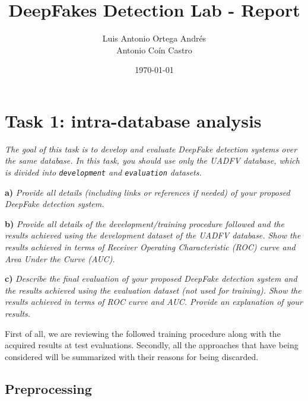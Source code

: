 \documentclass[11pt]{article}
\author{Luis Antonio Ortega Andrés\\Antonio Coín Castro}
\date{\today}
\title{DeepFakes Detection Lab - Report}
\begin{document}
\maketitle

\section*{Task 1: intra-database analysis}

\textit{The goal of this task is to develop and evaluate DeepFake detection systems over the same database. In this task, you should use only the UADFV database, which is divided into \texttt{development} and \texttt{evaluation} datasets.}

\textbf{a)} \textit{Provide all details (including links or references if needed) of your proposed DeepFake detection system.}

\textbf{b)} \textit{Provide all details of the development/training procedure followed and the results achieved using the development dataset of the UADFV database. Show the results achieved in terms of Receiver Operating Characteristic (ROC) curve and Area Under the Curve (AUC).}

\textbf{c)} \textit{Describe the final evaluation of your proposed DeepFake detection system and the results achieved using the evaluation dataset (not used for training). Show the results achieved in terms of ROC curve and AUC. Provide an explanation of your results.}

First of all, we are reviewing the followed training procedure along with the acquired results at test evaluations. Secondly, all the approaches that have being considered will be summarized with their reasons for being discarded.

\subsection*{Preprocessing}
\end{document}
